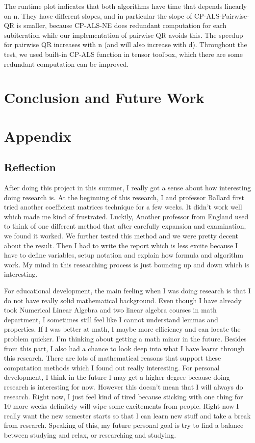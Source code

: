 \documentclass{article}
\begin{document}
The runtime plot indicates that both algorithms have time that depends linearly on n.  
They have different slopes, and in particular the slope of CP-ALS-Pairwise-QR is smaller, because CP-ALS-NE does redundant computation for each subiteration while our implementation of pairwise QR avoids this. 
The speedup for pairwise QR increases with n (and will also increase with d).
Throughout the test, we used built-in CP-ALS function in tensor toolbox, which there are some redundant computation can be improved.

\section{Conclusion and Future Work}

\section{Appendix}
\subsection{Reflection}
After doing this project in this summer, I really got a sense about how interesting doing research is.
At the beginning of this research, I and professor Ballard first tried another coefficient matrices technique for a few weeks. 
It didn't work well which made me kind of frustrated. 
Luckily, Another professor from England used to think of one different method that after carefully expansion and examination, we found it worked. 
We further tested this method and we were pretty decent about the result.
Then I had to write the report which is less excite because I have to define variables, setup notation and explain how formula and algorithm work. 
My mind in this researching process is just bouncing up and down which is interesting.

For educational development, the main feeling when I was doing research is that I do not have really solid mathematical background. 
Even though I have already took Numerical Linear Algebra and two linear algebra courses in math department, I sometimes still feel like I cannot understand lemmas and properties. 
If I was better at math, I maybe more efficiency and can locate the problem quicker. 
I'm thinking about getting a math minor in the future. 
Besides from this part, I also had a chance to look deep into what I have learnt through this research.
There are lots of mathematical reasons that support these computation methods which I found out really interesting.
For personal development, I think in the future I may get a higher degree because doing research is interesting for now. 
However this doesn't mean that I will always do research.
Right now, I just feel kind of tired because sticking with one thing for 10 more weeks definitely will wipe some excitements from people.
Right now I really want the new semester starts so that I can learn new stuff and take a break from research.
Speaking of this, my future personal goal is try to find a balance between studying and relax, or researching and studying.




\end{document}
